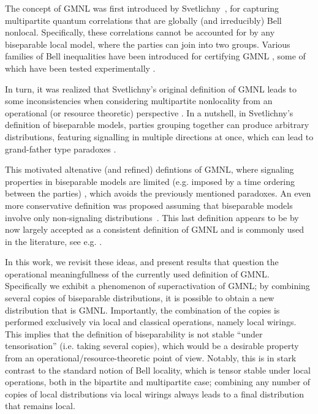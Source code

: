 \documentclass[pra,aps,reprint,superscriptaddress]{revtex4-2}
\theoremstyle{theorem}
\begin{document}
The concept of GMNL was first introduced by Svetlichny~\cite{svetlichny87}, for capturing multipartite quantum correlations that are globally (and irreducibly) Bell nonlocal. Specifically, these correlations cannot be accounted for by any biseparable local model, where the parties can join into two groups. Various families of Bell inequalities have been introduced for certifying GMNL \cite{Seevinck2002,Collins2002,Bancal2011}, some of which have been tested experimentally \cite{Lavoie2009}. 


In turn, it was realized that Svetlichny's original definition of GMNL leads to some inconsistencies when considering multipartite nonlocality from an operational (or resource theoretic) perspective \cite{Gallego2012}. In a nutshell, in Svetlichny's definition of biseparable models, parties grouping together can produce arbitrary distributions, featuring signalling in multiple directions at once, which can lead to grand-father type paradoxes \cite{Bancal2013}. 

This motivated altenative (and refined) defintions of GMNL, where signaling properties in biseparable models are limited (e.g. imposed by a time ordering between the parties) \cite{Gallego2012,Bancal2013}, which avoids the previously mentioned paradoxes. An even more conservative definition was proposed assuming that biseparable models involve only non-signaling distributions~\cite{Bancal2013}. This last definition appears to be by now largely accepted as a consistent definition of GMNL and is commonly used in the literature, see e.g. \cite{Baccari2019,Horodecki2019,Curchod_2019,Contreras_Tejada_2021}.

In this work, we revisit these ideas, and present results that question the operational meaningfullness of the currently used definition of GMNL. Specifically we exhibit a phenomenon of superactivation of GMNL; by combining several copies of biseparable distributions, it is possible to obtain a new distribution that is GMNL. Importantly, the combination of the copies is performed exclusively via local and classical operations, namely local wirings. This implies that the definition of biseparability is not stable ``under tensorisation'' (i.e. taking several copies), which would be a desirable property from an operational/resource-theoretic point of view. Notably, this is in stark contrast to the standard notion of Bell locality, which is tensor stable under local operations, both in the bipartite and multipartite case; combining any number of copies of local distributions via local wirings always leads to a final distribution that remains local.
\end{document}
